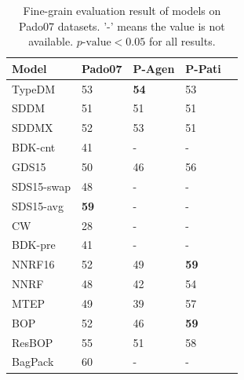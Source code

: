 \documentclass[a4paper]{article}
\begin{document}
\begin{table}[t]
\centering
\begin{tabular}{lllll}
\textbf{Model}  &   Pado07 &   P-Agen   &   P-Pati \\ \hline  \hline
TypeDM      &   53      &\textbf{54}&   53          \\
SDDM        &   51      &   51      &   51          \\
SDDMX       &   52      &   53      &   51          \\
BDK-cnt     &   41      &   -       &   -           \\
GDS15       &   50      &   46      &   56          \\  
SDS15-swap  &   48      &   -       &   -           \\
SDS15-avg   &\textbf{59}&   -       &   -           \\  \hline
CW          &   28      &   -       &   -           \\
BDK-pre     &   41      &   -       &   -           \\
NNRF16      &   52      &   49      &   \textbf{59} \\  \hline  \hline
NNRF        &   48      &   42      &   54          \\
MTEP        &   49      &   39      &   57          \\
BOP         &   52      &   46      &   \textbf{59} \\
ResBOP      &   55      &   51      &   58          \\  \hline  \hline
BagPack     & 60    &   -       &   -           \\
\end{tabular}
\caption{\label{tab:eval-thematic-pado07} Fine-grain evaluation result of models on Pado07 datasets. '-' means the value is not available.  $p\text{-value} < 0.05$ for all results. }
\end{table}
\end{document}
